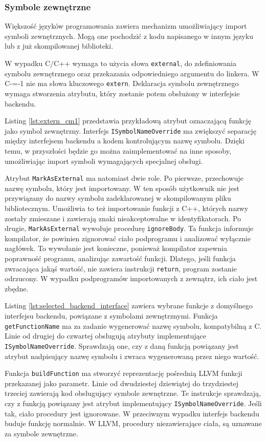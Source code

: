 \subsubsection{Symbole zewnętrzne}
Większość języków programowania zawiera mechanizm umożliwiający import symboli zewnętrznych.
Mogą one pochodzić z kodu napisanego w innym języku lub z już skompilowanej biblioteki.

W wypadku C/C++ wymaga to użycia słowa \lstinline{external}, do zdefiniowania symbolu zewnętrznego oraz przekazania odpowiedniego argumentu do linkera.
W C-=-1 nie ma słowa kluczowego \lstinline{extern}.
Deklaracja symbolu zewnętrznego wymaga stworzenia atrybutu, który zostanie potem obsłużony w interfejsie backendu.

Listing \ref{lst:extern_cm1} przedstawia przykładową atrybut oznaczającą funkcję jako symbol zewnętrzny.
Interfejs \lstinline{ISymbolNameOverride} ma zwiększyć separację między interfejsem backendu a kodem kontrolującym nazwę symbolu.
Dzięki temu, w przyszłości będzie go można zaimplementować na inne sposoby, umożliwiając import symboli wymagających specjalnej obsługi.

Atrybut \lstinline{MarkAsExternal} ma natomiast dwie role.
Po pierwsze, przechowuje nazwę symbolu, który jest importowany.
W ten sposób użytkownik nie jest przywiązany do nazwy symbolu zadeklarowanej w skompilowanym pliku bibliotecznym.
Umożliwia to też importowanie funkcji z C++, których nazwy zostały zmieszane i zawierają znaki nieakceptowalne w identyfikatorach.
Po drugie, \lstinline{MarkAsExternal} wywołuje procedurę \lstinline{ignoreBody}.
Ta funkcja informuje kompilator, że powinien zignorować ciało podprogramu i analizować wyłącznie nagłówek.
To wywołanie jest konieczne, ponieważ kompilator zapewnia poprawność programu, analizując zawartość funkcji.
Dlatego, jeśli funkcja zwracająca jakąś wartość, nie zawiera instrukcji \lstinline{return}, program zostanie odrzucony.
W wypadku podprogramów importowanych z zewnątrz, ich ciało jest zbędne.

Listing \ref{lst:selected_backend_interface} zawiera wybrane funkcje z domyślnego interfejsu backendu, powiązane z symbolami zewnętrznymi.
Funkcja \lstinline{getFunctionName} ma za zadanie wygenerować nazwę symbolu, kompatybilną z C.
Linie od drugiej do czwartej obsługują atrybuty implementujące \lstinline{ISymbolNameOverride}.
Sprawdzają one, czy z daną funkcją powiązany jest atrybut nadpisujący nazwę symbolu i zwraca wygenerowaną przez niego wartość.

Funkcja \lstinline{buildFunction} ma stworzyć reprezentację pośrednią LLVM funkcji przekazanej jako parametr.
Linie od dwudziestej dziewiątej do trzydziestej trzeciej zawierają kod obsługujący symbole zewnętrzne.
Te instrukcje sprawdzają, czy z funkcją powiązany jest atrybut implementujący \lstinline{ISymbolNameOverride}.
Jeśli tak, ciało procedury jest ignorowane.
W przeciwnym wypadku interfejs backendu buduje funkcję normalnie.
W LLVM, procedury niezawierające ciała, są uznawane za symbole zewnętrzne.

